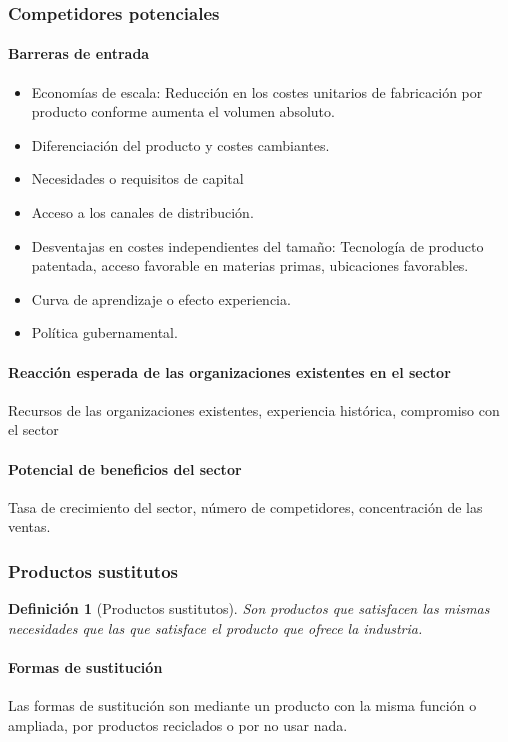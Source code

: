 \documentclass[12pt]{article}
\theoremstyle{definition_wo_parentheses}
\newtheorem{definicion}{Definición}[section]
\begin{document}
\subsubsection{Competidores potenciales}

\paragraph{Barreras de entrada}
\begin{itemize}
\item Economías de escala: Reducción en los costes unitarios de fabricación por producto conforme aumenta el volumen absoluto.
\item Diferenciación del producto y costes cambiantes.
\item Necesidades o requisitos de capital
\item Acceso a los canales de distribución.
\item Desventajas en costes independientes del tamaño: Tecnología de producto patentada, acceso favorable en materias primas, ubicaciones favorables.
\item Curva de aprendizaje o efecto experiencia.
\item Política gubernamental.
\end{itemize}

\paragraph{Reacción esperada de las organizaciones existentes en el sector} Recursos de las organizaciones existentes, experiencia histórica, compromiso con el sector

\paragraph{Potencial de beneficios del sector} Tasa de crecimiento del sector, número de competidores, concentración de las ventas.

\subsubsection{Productos sustitutos}

\begin{definicion}[Productos sustitutos]
Son productos que satisfacen las mismas necesidades que las que satisface el producto que ofrece la industria.
\end{definicion}

\paragraph{Formas de sustitución} Las formas de sustitución son mediante un producto con la misma función o ampliada, por productos reciclados o por no usar nada.
\end{document}

